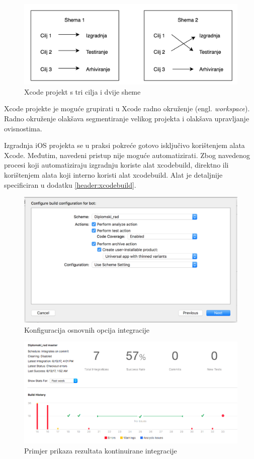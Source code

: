 \documentclass[times, utf8, diplomski, numeric]{fer}
\newcommand{\eng}[1]{(engl. \textit{#1})}
\begin{document}
\begin{figure}[b!]
\centering
\includegraphics[scale=0.5]{TargetScheme}
\caption{Xcode projekt s tri cilja i dvije sheme}
\label{fig:TargetScheme}
\end{figure}

Xcode projekte je moguće grupirati u Xcode radno okruženje \eng{workspace}. Radno okruženje olakšava segmentiranje velikog projekta i olakšava upravljanje ovisnostima.

Izgradnja iOS projekta se u praksi pokreće gotovo isključivo korištenjem alata Xcode. Međutim, navedeni pristup nije moguće automatizirati. Zbog navedenog procesi koji automatiziraju izgradnju koriste alat xcodebuild, direktno ili korištenjem alata koji interno koristi alat xcodebuild. Alat je detaljnije specificiran u dodatku \ref{header:xcodebuild}.

\begin{figure}
\centering
\includegraphics[scale=0.5]{XcodeServerOptions}
\caption{Konfiguracija osnovnih opcija integracije}
\label{fig:XcodeServerOptions}
\end{figure}

\begin{figure}[b!]
\centering
\includegraphics[scale=0.5]{XcodeServerResult}
\caption{Primjer prikaza rezultata kontinuirane integracije}
\label{fig:XcodeServerResult}
\end{figure}
\end{document}
